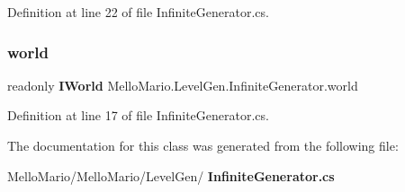 Definition at line 22 of file Infinite\+Generator.\+cs.

\mbox{\label{classMelloMario_1_1LevelGen_1_1InfiniteGenerator_acbf56ecf470f60a9e7ceb00779db72aa}} 
\subsubsection{world}
{\footnotesize\ttfamily readonly \textbf{ I\+World} Mello\+Mario.\+Level\+Gen.\+Infinite\+Generator.\+world\hspace{0.3cm}{\ttfamily [private]}}



Definition at line 17 of file Infinite\+Generator.\+cs.



The documentation for this class was generated from the following file\+:\begin{DoxyCompactItemize}
\item 
Mello\+Mario/\+Mello\+Mario/\+Level\+Gen/\textbf{ Infinite\+Generator.\+cs}\end{DoxyCompactItemize}
